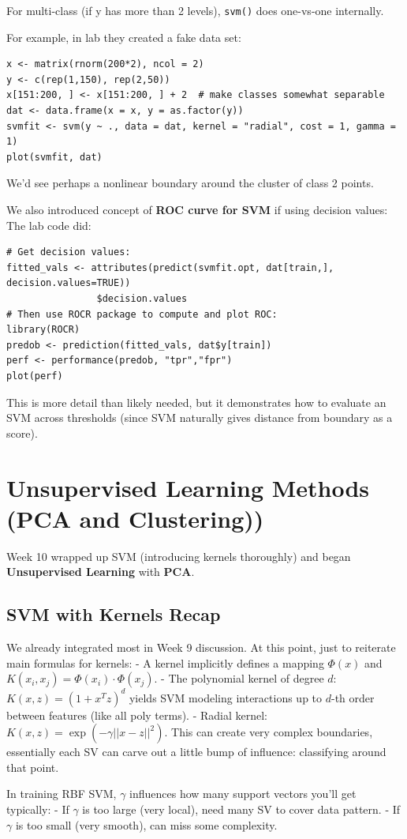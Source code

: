 \documentclass[11pt]{article}
\begin{document}
For multi-class (if y has more than 2 levels), \texttt{svm()} does one-vs-one internally.

For example, in lab they created a fake data set:
\begin{verbatim}
x <- matrix(rnorm(200*2), ncol = 2)
y <- c(rep(1,150), rep(2,50))
x[151:200, ] <- x[151:200, ] + 2  # make classes somewhat separable
dat <- data.frame(x = x, y = as.factor(y))
svmfit <- svm(y ~ ., data = dat, kernel = "radial", cost = 1, gamma = 1)
plot(svmfit, dat)
\end{verbatim}
We'd see perhaps a nonlinear boundary around the cluster of class 2 points.

We also introduced concept of \textbf{ROC curve for SVM} if using decision values:
The lab code did:
\begin{verbatim}
# Get decision values:
fitted_vals <- attributes(predict(svmfit.opt, dat[train,], decision.values=TRUE))
                $decision.values
# Then use ROCR package to compute and plot ROC:
library(ROCR)
predob <- prediction(fitted_vals, dat$y[train])
perf <- performance(predob, "tpr","fpr")
plot(perf)
\end{verbatim}
This is more detail than likely needed, but it demonstrates how to evaluate an SVM across thresholds (since SVM naturally gives distance from boundary as a score).

\section{Unsupervised Learning Methods (PCA and Clustering))}
Week 10 wrapped up SVM (introducing kernels thoroughly) and began \textbf{Unsupervised Learning} with \textbf{PCA}.

\subsection{SVM with Kernels Recap}
We already integrated most in Week 9 discussion. At this point, just to reiterate main formulas for kernels:
- A kernel implicitly defines a mapping $\Phi(x)$ and $K(x_i, x_j) = \Phi(x_i)\cdot \Phi(x_j)$.
- The polynomial kernel of degree $d$: $K(x,z)=(1+x^T z)^d$ yields SVM modeling interactions up to $d$-th order between features (like all poly terms).
- Radial kernel: $K(x,z)=\exp(-\gamma ||x-z||^2)$. This can create very complex boundaries, essentially each SV can carve out a little bump of influence: classifying around that point.

In training RBF SVM, $\gamma$ influences how many support vectors you'll get typically:
- If $\gamma$ is too large (very local), need many SV to cover data pattern.
- If $\gamma$ is too small (very smooth), can miss some complexity.
\end{document}
